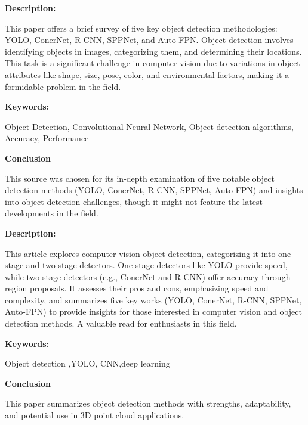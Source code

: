 
{ 
	
	\textbf{Description:}
	
This paper offers a brief survey of five key object detection methodologies: YOLO, ConerNet, R-CNN, SPPNet, and Auto-FPN. Object detection involves identifying objects in images, categorizing them, and determining their locations. This task is a significant challenge in computer vision due to variations in object attributes like shape, size, pose, color, and environmental factors, making it a formidable problem in the field.\autocite{Ahn:2023}





	
	
	
	\textbf{Keywords:} 
	
	Object Detection, Convolutional Neural Network, Object detection algorithms, Accuracy, Performance
	
	
	\textbf{Conclusion } 
	
	This source was chosen for its in-depth examination of five notable object detection methods (YOLO, ConerNet, R-CNN, SPPNet, Auto-FPN) and insights into object detection challenges, though it might not feature the latest developments in the field.

	}



{ 
	
	\textbf{Description:}
	
	This article explores computer vision object detection, categorizing it into one-stage and two-stage detectors. One-stage detectors like YOLO provide speed, while two-stage detectors (e.g., ConerNet and R-CNN) offer accuracy through region proposals. It assesses their pros and cons, emphasizing speed and complexity, and summarizes five key works (YOLO, ConerNet, R-CNN, SPPNet, Auto-FPN) to provide insights for those interested in computer vision and object detection methods. A valuable read for enthusiasts in this field.\autocite{Shi:2022}   





	
	
	
	\textbf{Keywords:} 
	
	Object detection ,YOLO, CNN,deep learning
	
	
	\textbf{Conclusion } 
	

	This paper summarizes object detection methods with strengths, adaptability, and potential use in 3D point cloud applications.

	}



